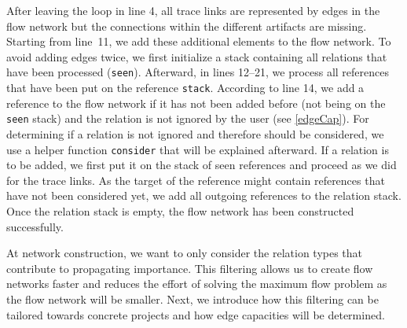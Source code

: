After leaving the loop in line 4, all trace links are represented by edges in the flow network but the connections within the different artifacts are missing.
Starting from line~11, we add these additional elements to the flow network.
To avoid adding edges twice, we first initialize a stack containing all relations that have been processed (\texttt{seen}).
Afterward, in lines 12--21, we process all  references that have been put on the reference \texttt{stack}.
According to  line 14, we add a reference to the flow network if it has not been added before (not being on the \texttt{seen} stack) and the relation is not ignored by the user (see \autoref{edgeCap}).
For determining if a relation is not ignored and therefore should be considered, we use a helper function \texttt{consider} that will be explained afterward.
If a relation is to be added, we first put it on the stack of seen references and proceed as we did for the trace links.
As the target of the reference might contain references that have not been considered yet, we add all outgoing references to the relation stack.
Once the relation stack is empty, the flow network has been constructed successfully.

At network construction, we want to only consider the relation types that contribute to propagating importance.
This filtering allows us to create flow networks faster and reduces the effort of solving the maximum flow problem as the flow network will be smaller.
Next, we introduce how this filtering can be tailored towards concrete projects and how edge capacities will be determined.

